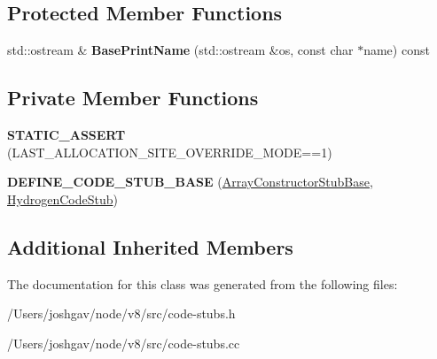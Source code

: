 \subsection*{Protected Member Functions}
\begin{DoxyCompactItemize}
\item 
std\+::ostream \& {\bfseries Base\+Print\+Name} (std\+::ostream \&os, const char $\ast$name) const \hypertarget{classv8_1_1internal_1_1_array_constructor_stub_base_a8c9043c3d4da034c95543ca9c1a817d9}{}\label{classv8_1_1internal_1_1_array_constructor_stub_base_a8c9043c3d4da034c95543ca9c1a817d9}

\end{DoxyCompactItemize}
\subsection*{Private Member Functions}
\begin{DoxyCompactItemize}
\item 
{\bfseries S\+T\+A\+T\+I\+C\+\_\+\+A\+S\+S\+E\+RT} (L\+A\+S\+T\+\_\+\+A\+L\+L\+O\+C\+A\+T\+I\+O\+N\+\_\+\+S\+I\+T\+E\+\_\+\+O\+V\+E\+R\+R\+I\+D\+E\+\_\+\+M\+O\+DE==1)\hypertarget{classv8_1_1internal_1_1_array_constructor_stub_base_a06f2b5912e681a81d494e9f0c2ae18b8}{}\label{classv8_1_1internal_1_1_array_constructor_stub_base_a06f2b5912e681a81d494e9f0c2ae18b8}

\item 
{\bfseries D\+E\+F\+I\+N\+E\+\_\+\+C\+O\+D\+E\+\_\+\+S\+T\+U\+B\+\_\+\+B\+A\+SE} (\hyperlink{classv8_1_1internal_1_1_array_constructor_stub_base}{Array\+Constructor\+Stub\+Base}, \hyperlink{classv8_1_1internal_1_1_hydrogen_code_stub}{Hydrogen\+Code\+Stub})\hypertarget{classv8_1_1internal_1_1_array_constructor_stub_base_a9b1564fdc1af979f5dc9b84526121071}{}\label{classv8_1_1internal_1_1_array_constructor_stub_base_a9b1564fdc1af979f5dc9b84526121071}

\end{DoxyCompactItemize}
\subsection*{Additional Inherited Members}


The documentation for this class was generated from the following files\+:\begin{DoxyCompactItemize}
\item 
/\+Users/joshgav/node/v8/src/code-\/stubs.\+h\item 
/\+Users/joshgav/node/v8/src/code-\/stubs.\+cc\end{DoxyCompactItemize}
